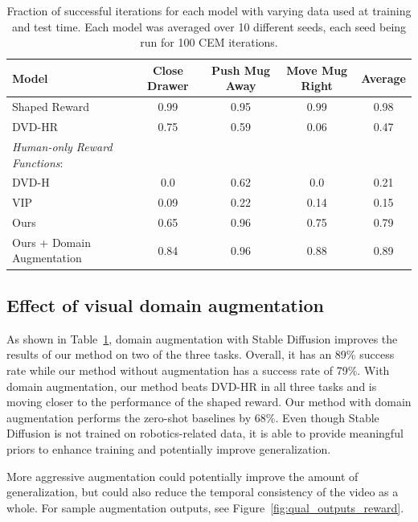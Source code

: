 \begin{table}[t]
    \centering
    \resizebox{\linewidth}{!}
    {%
        \begin{tabular}{lcccc}
        \toprule
        Model & Close Drawer & Push Mug Away & Move Mug Right & Average \\
        \midrule\midrule
        Shaped Reward & 0.99 & 0.95 & 0.99 & 0.98 \\
        DVD-HR \cite{DVD} & 0.75 & 0.59 & 0.06 & 0.47 \\
        \midrule
        \textit{Human-only Reward Functions}: \\
        DVD-H \cite{DVD} & 0.0 & 0.62 & 0.0 & 0.21 \\
        VIP \cite{VIP} & 0.09 & 0.22 & 0.14 & 0.15 \\
        \midrule
        Ours & 0.65 & 0.96 & 0.75 & 0.79 \\
        Ours + Domain Augmentation & 0.84 & 0.96 & 0.88 & 0.89 \\
        \bottomrule
        \end{tabular}
    }
    \caption{Fraction of successful iterations for each model with varying data used at training and test time. Each model was averaged over 10 different seeds, each seed being run for 100 CEM iterations.}
    \label{table:baseline_comparison_reward}

    \vspace{-0.3cm}
\end{table}

\subsection{Effect of visual domain augmentation}

As shown in Table~\ref{table:baseline_comparison_reward}, domain augmentation with Stable Diffusion improves the results of our method on two of the three tasks. Overall, it has an 89\% success rate while our method without augmentation has a success rate of 79\%. With domain augmentation, our method beats DVD-HR in all three tasks and is moving closer to the performance of the shaped reward. Our method with domain augmentation performs the zero-shot baselines by 68\%. Even though Stable Diffusion is not trained on robotics-related data, it is able to provide meaningful priors to enhance training and potentially improve generalization.

More aggressive augmentation could potentially improve the amount of generalization, but could also reduce the temporal consistency of the video as a whole. For sample augmentation outputs, see Figure~\ref{fig:qual_outputs_reward}.

